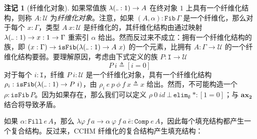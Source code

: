 \documentclass{ctexart}
\theoremstyle{plain}
\theoremstyle{definition}
\theoremstyle{definition}
\theoremstyle{definition}
\newtheorem{remark}[theorem]{注记}
\theoremstyle{definition}
\newcommand\ttI{\mathtt{I}}
\newcommand{\ax}[1]{\mathbf{ax_{#1}}}
\newcommand{\ul}{{\rule[0ex]{0.4em}{0.4pt}}} %
\numberwithin{equation}{section}
\begin{document}
\begin{remark}[纤维化对象]
  如果常值族 $\lambda(\ul : 1) \to A$ 在终对象 $1$ 上具有一个纤维化结构，则称 $A : \mathcal{U}$ 为\textit{纤维化对象}。注意，如果 $(A, \alpha) : \mathtt{Fib} \, \Gamma$ 是一个纤维化，那么对于每个 $x : \Gamma$，类型 $A\ x : \mathcal{U}$ 是纤维化的，其纤维化结构由通过映射 $\lambda(\ul : 1) \to x : 1 \to \Gamma$ 重索引 $\alpha$ 给出。然而反过来不成立：拥有一个纤维化结构的族，即 $(x : \Gamma) \to \mathtt{isFib}(\lambda(\ul : 1) \to A\ x)$ 的一个元素，比拥有 $A : \Gamma \to \mathcal{U}$ 的一个纤维化结构要弱。要理解原因，考虑由下式定义的族 $P : {\ttI} \to \mathcal{U}$
\begin{equation}P\ i \triangleq [i = 0]\end{equation}
对于每个 $i : {\ttI}$，纤维 $P\ i : \mathcal{U}$ 是一个纤维化对象，具有一个纤维化结构 $\rho_i : \mathtt{isFib}(\lambda(\ul : 1) \to P\ i)$，由 $\rho_i \ e \ p \ \phi \ f \ x \triangleq x$ 给出。然而，不可能构造一个 $\rho : \mathtt{isFib} \, P$。因为如果存在，那么我们可以定义 $\rho \ 0 \ id \ \bot \, \mathtt{elim}_\emptyset \ * : [1 = 0]$；与 $\ax{2}$ 结合将导致矛盾。
\end{remark}

如果 $\alpha : \mathtt{Fill} \, e \, A$，那么 $\lambda \varphi \, f \, a \to \alpha \ \varphi \ f \ a \ \bar{e} : \mathtt{Comp} \ e \, A$，因此每个填充结构都产生一个复合结构。反过来，CCHM 纤维化的复合结构产生填充结构：
\end{document}
